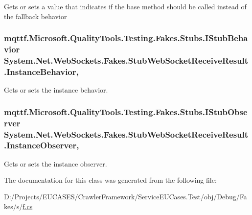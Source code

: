 Gets or sets a value that indicates if the base method should be called instead of the fallback behavior

\hypertarget{class_system_1_1_net_1_1_web_sockets_1_1_fakes_1_1_stub_web_socket_receive_result_a8483a5ff6ccaf14b18d84f24032d5ac4}{
\subsubsection[{Instance\-Behavior}]{\setlength{\rightskip}{0pt plus 5cm}mqttf.\-Microsoft.\-Quality\-Tools.\-Testing.\-Fakes.\-Stubs.\-I\-Stub\-Behavior System.\-Net.\-Web\-Sockets.\-Fakes.\-Stub\-Web\-Socket\-Receive\-Result.\-Instance\-Behavior\hspace{0.3cm}{\ttfamily [get]}, {\ttfamily [set]}}}\label{class_system_1_1_net_1_1_web_sockets_1_1_fakes_1_1_stub_web_socket_receive_result_a8483a5ff6ccaf14b18d84f24032d5ac4}


Gets or sets the instance behavior.

\hypertarget{class_system_1_1_net_1_1_web_sockets_1_1_fakes_1_1_stub_web_socket_receive_result_a3a5c27c89128ceef381ea92edc1bd81f}{
\subsubsection[{Instance\-Observer}]{\setlength{\rightskip}{0pt plus 5cm}mqttf.\-Microsoft.\-Quality\-Tools.\-Testing.\-Fakes.\-Stubs.\-I\-Stub\-Observer System.\-Net.\-Web\-Sockets.\-Fakes.\-Stub\-Web\-Socket\-Receive\-Result.\-Instance\-Observer\hspace{0.3cm}{\ttfamily [get]}, {\ttfamily [set]}}}\label{class_system_1_1_net_1_1_web_sockets_1_1_fakes_1_1_stub_web_socket_receive_result_a3a5c27c89128ceef381ea92edc1bd81f}


Gets or sets the instance observer.



The documentation for this class was generated from the following file\-:\begin{DoxyCompactItemize}
\item 
D\-:/\-Projects/\-E\-U\-C\-A\-S\-E\-S/\-Crawler\-Framework/\-Service\-E\-U\-Cases.\-Test/obj/\-Debug/\-Fakes/s/\hyperlink{s_2f_8cs}{f.\-cs}\end{DoxyCompactItemize}
